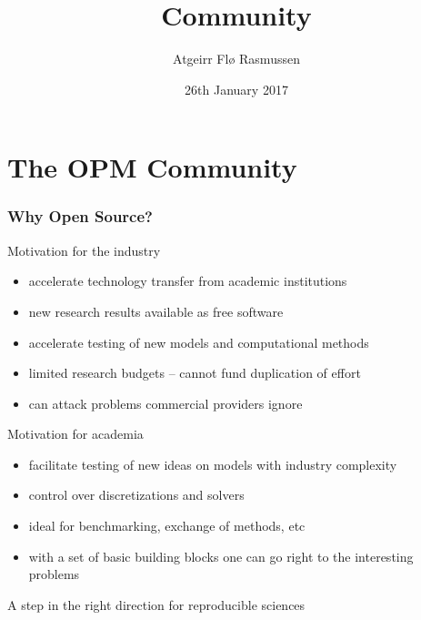 \documentclass[UKenglish,10pt]{beamer}
\title{Community}
\author[Atgeirr F. Rasmussen]{Atgeirr Fl{\o} Rasmussen}
\institute[SINTEF]{SINTEF ICT, Dept. Applied Mathematics}
\date[2017--01--26]{26th January 2017}
\begin{document}
\section{The OPM Community}



\begin{frame}
  \frametitle{Why Open Source?}
  \begin{block}{Motivation for the industry}
    \begin{itemize}
    \item accelerate technology transfer from academic institutions
    \item new research results available as free software 
    \item accelerate testing of new models and computational methods
    \item limited research budgets -- cannot fund duplication of effort
    \item can attack problems commercial providers ignore
    \end{itemize}
  \end{block}
  \begin{block}{Motivation for academia}
    \begin{itemize}
    \item facilitate testing of new ideas on models with industry complexity
    \item control over discretizations and solvers
    \item ideal for benchmarking, exchange of methods, etc
    \item with a set of basic building blocks one can go right to the
      interesting problems
    \end{itemize}
  \end{block}
  A step in the right direction for reproducible sciences
\end{frame}
\end{document}
